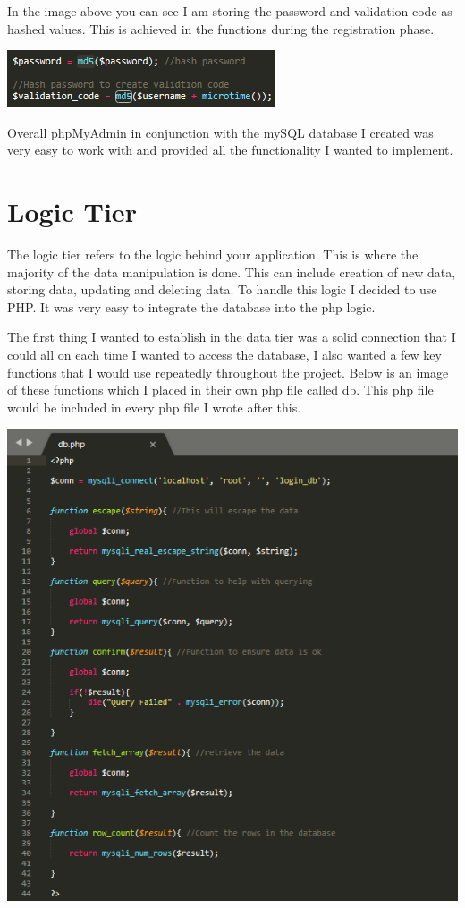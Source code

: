 In the image above you can see I am storing the password and validation code as hashed values.
This is achieved in the functions during the registration phase.

\includegraphics[width=\textwidth,height=\textheight,keepaspectratio]{img/hash.png}

Overall phpMyAdmin in conjunction with the mySQL database I created was very easy to work with and provided all the functionality I wanted to implement.

\section{Logic Tier}
The logic tier refers to the logic behind your application. This is where the majority of the data manipulation is done. This can include creation of new data, storing data, updating and deleting data. To handle this logic I decided to use PHP. It was very easy to integrate the database into the php logic. 

The first thing I wanted to establish in the data tier was a solid connection that I could all on each time I wanted to access the database, I also wanted a few key functions that I would use repeatedly throughout the project. Below is an image of these functions which I placed in their own php file called db. This php file would be included in every php file I wrote after this.



\includegraphics[width=\textwidth,height=\textheight,keepaspectratio]{img/db.png}

